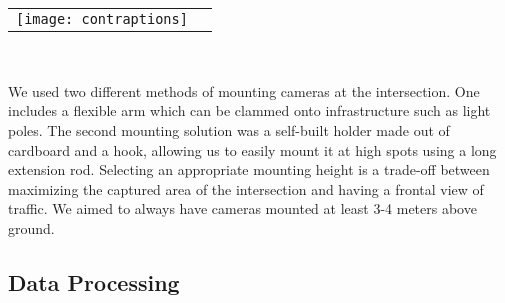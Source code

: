 \ \\





\ \\ 
\raggedbottom
\begin{tabular}{@{}cc}
\texttt{[image: contraptions]}
\end{tabular}
\label{camera_mouns}
\

We used two different methods of mounting cameras at the intersection. One includes a flexible arm which can be clammed onto infrastructure such as light poles.
The second mounting solution was a self-built holder made out of cardboard and a hook, allowing us to easily mount it at high spots using a long extension rod.
Selecting an appropriate mounting height is a trade-off between maximizing the captured area of the intersection and having a frontal view of traffic.
We aimed to always have cameras mounted at least 3-4 meters above ground.

\subsection{Data Processing}
\ \\ 

